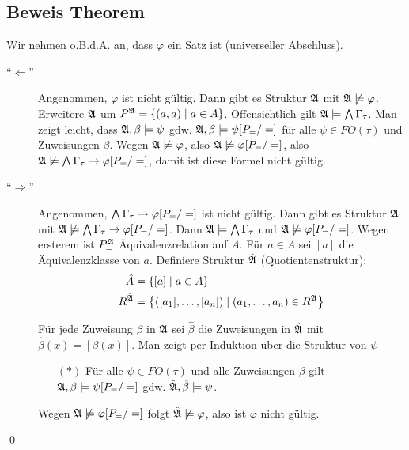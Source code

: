 \subsection{Beweis Theorem}

Wir nehmen o.B.d.A. an, dass $\varphi$ ein Satz ist (universeller Abschluss).

\begin{description}
  \item[\enquote{$\Leftarrow$}]
  Angenommen, $\varphi$ ist nicht gültig. Dann gibt es Struktur $\mathfrak{A}$ mit $\mathfrak{A}\not\models\varphi$.
  Erweitere $\mathfrak{A}$ um $P^{\mathfrak{A}} = \left\{(a,a)\mid a\in A\right\}$.
  Offensichtlich gilt $\mathfrak{A}\models\operatorname*{\bigwedge}\Gamma_\tau$. Man zeigt leicht, dass $\mathfrak{A},\beta\models\psi$ gdw. $\mathfrak{A},\beta\models\psi[P_=/=]$ für alle $\psi\in FO(\tau)$ und Zuweisungen $\beta$. Wegen $\mathfrak{A}\not\models\varphi$, also $\mathfrak{A}\not\models\varphi[P_=/=]$, also $\mathfrak{A}\not\models\operatorname*{\bigwedge}\Gamma_\tau \rightarrow \varphi[P_=/=]$, damit ist diese Formel nicht gültig.
  
  \item[\enquote{$\Rightarrow$}]
  Angenommen, $\operatorname*{\bigwedge}\Gamma_\tau \rightarrow \varphi[P_=/=]$ ist nicht gültig. Dann gibt es Struktur $\mathfrak{A}$ mit $\mathfrak{A}\not\models\operatorname*{\bigwedge}\Gamma_\tau\rightarrow\varphi[P_=/=]$. Dann $\mathfrak{A}\models\operatorname*{\bigwedge}\Gamma_\tau$ und $\mathfrak{A}\not\models\varphi[P_=/=]$. Wegen ersterem ist $P_=^{\mathfrak{A}}$ Äquivalenzrelation auf $A$. Für $a\in A$ sei $[a]$ die Äquivalenzklasse von $a$. Definiere Struktur $\hat{\mathfrak{A}}$ (Quotientenstruktur):
  \begin{align*}
    \hat{A} &= \left\{[a] \mid a\in A\right\}\\
    R^{\hat{\mathfrak{A}}} &= \left\{([a_1],\dots,[a_n]) \mid (a_1,\dots,a_n) \in R^{\mathfrak{A}} \right\}\\
  \end{align*}
  
  Für jede Zuweisung $\beta$ in $\mathfrak{A}$ sei $\hat{\beta}$ die Zuweisungen in $\hat{\mathfrak{A}}$ mit $\hat{\beta}(x)=[\beta(x)]$. Man zeigt per Induktion über die Struktur von $\psi$
  \begin{itemize}
    \item[$(*)$] Für alle $\psi\in FO(\tau)$ und alle Zuweisungen $\beta$ gilt $\mathfrak{A},\beta\models\psi[P_=/=]$ gdw. $\hat{\mathfrak{A}},\hat{\beta}\models\psi$.
  \end{itemize}
  Wegen $\mathfrak{A}\not\models\varphi[P_=/=]$ folgt $\hat{\mathfrak{A}}\not\models\varphi$, also ist $\varphi$ nicht gültig.
\end{description}
\qed
